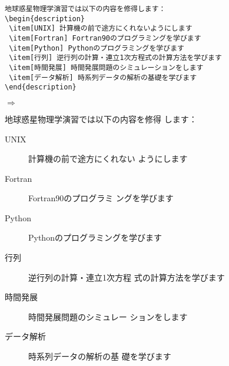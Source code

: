 \begin{minipage}[c]{.50\textwidth}
\begin{screen}
\small
\begin{verbatim}
地球惑星物理学演習では以下の内容を修得します：
\begin{description}
 \item[UNIX] 計算機の前で途方にくれないようにします
 \item[Fortran] Fortran90のプログラミングを学びます
 \item[Python] Pythonのプログラミングを学びます
 \item[行列] 逆行列の計算・連立1次方程式の計算方法を学びます
 \item[時間発展] 時間発展問題のシミュレーションをします
 \item[データ解析] 時系列データの解析の基礎を学びます
\end{description}
\end{verbatim}
\end{screen}
\end{minipage}%
$\Rightarrow$
\begin{minipage}{.50\textwidth}
\begin{shadebox}
地球惑星物理学演習では以下の内容を修得
します：
\begin{description}
 \item[UNIX] 計算機の前で途方にくれない
           ようにします
 \item[Fortran] Fortran90のプログラミ
           ングを学びます
 \item[Python] Pythonのプログラミングを学びます
 \item[行列] 逆行列の計算・連立1次方程
           式の計算方法を学びます
 \item[時間発展] 時間発展問題のシミュレー
           ションをします
 \item[データ解析] 時系列データの解析の基
           礎を学びます
\end{description}
\end{shadebox}
\end{minipage}\\
\vspace*{5mm}

